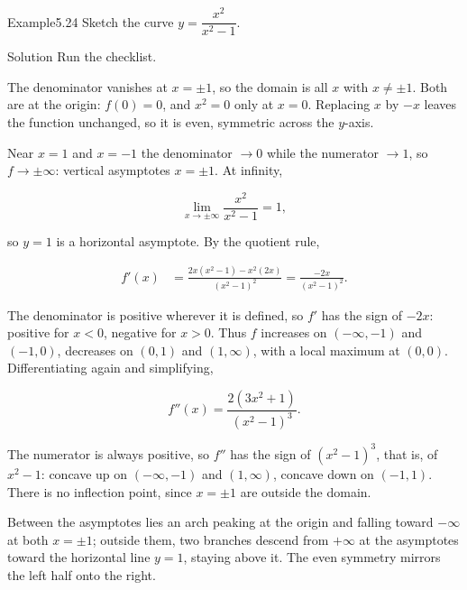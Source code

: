 \documentclass[a4paper,12pt,oneside]{memoir}
\begin{document}
\begin{workedexample}
\begin{envexample}{Example}{5.24}{}
Sketch the curve \(y = \dfrac{x^{2}}{x^{2} - 1}\).
\end{envexample}
\begin{envsolution}{Solution}{}{}
Run the checklist.

 The denominator vanishes at \(x = \pm 1\), so the domain is all \(x\) with \(x \ne \pm 1\).  Both are at the origin: \(f(0) = 0\), and \(x^{2} = 0\) only at \(x = 0\).  Replacing \(x\) by \(-x\) leaves the function unchanged, so it is even, symmetric across the \(y\)-axis.

 Near \(x = 1\) and \(x = -1\) the denominator \(\to 0\) while the numerator \(\to 1\), so \(f \to \pm\infty\): vertical asymptotes \(x = \pm 1\). At infinity,

\[ \lim_{x \to \pm\infty} \frac{x^{2}}{x^{2} - 1} = 1, \]

so \(y = 1\) is a horizontal asymptote.  By the quotient rule,

\[ \begin{aligned}
          f'(x) &= \frac{2x(x^{2} - 1) - x^{2}(2x)}{(x^{2} - 1)^{2}} = \frac{-2x}{(x^{2} - 1)^{2}}.
        \end{aligned} \]

The denominator is positive wherever it is defined, so \(f'\) has the sign of \(-2x\): positive for \(x < 0\), negative for \(x > 0\). Thus \(f\) increases on \((-\infty, -1)\) and \((-1, 0)\), decreases on \((0, 1)\) and \((1, \infty)\), with a local maximum at \((0, 0)\).  Differentiating again and simplifying,

\[ f''(x) = \frac{2(3x^{2} + 1)}{(x^{2} - 1)^{3}}. \]

The numerator is always positive, so \(f''\) has the sign of \((x^{2} - 1)^{3}\), that is, of \(x^{2} - 1\): concave up on \((-\infty, -1)\) and \((1, \infty)\), concave down on \((-1, 1)\). There is no inflection point, since \(x = \pm 1\) are outside the domain.

 Between the asymptotes lies an arch peaking at the origin and falling toward \(-\infty\) at both \(x = \pm 1\); outside them, two branches descend from \(+\infty\) at the asymptotes toward the horizontal line \(y = 1\), staying above it. The even symmetry mirrors the left half onto the right. \qedmark
\end{envsolution}
\end{workedexample}
\end{document}
